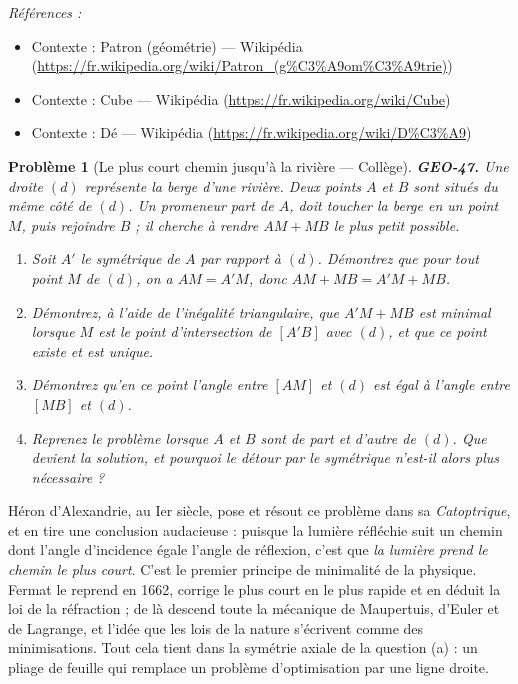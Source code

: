 \documentclass[11pt]{article}
\newtheorem{problem}{Problème}
\newenvironment{refs}{\par\small\noindent\emph{Références :}\begin{itemize}\setlength\itemsep{0pt}}{\end{itemize}\normalsize}
\begin{document}
\begin{refs}
\item Contexte : Patron (géométrie) --- Wikipédia (\url{https://fr.wikipedia.org/wiki/Patron_(g%C3%A9om%C3%A9trie)})
\item Contexte : Cube --- Wikipédia (\url{https://fr.wikipedia.org/wiki/Cube})
\item Contexte : Dé --- Wikipédia (\url{https://fr.wikipedia.org/wiki/D%C3%A9})
\end{refs}

\bigskip

\begin{problem}[{Le plus court chemin jusqu'à la rivière --- Collège}]
\textbf{GEO-47.} Une droite $ (d) $ représente la berge d'une rivière. Deux points $ A $ et
$ B $ sont situés du même côté de $ (d) $. Un promeneur part de $ A $, doit toucher la berge en
un point $ M $, puis rejoindre $ B $ ; il cherche à rendre $ AM + MB $ le plus petit possible.
\begin{enumerate}
\item[(a)] Soit $ A' $ le symétrique de $ A $ par rapport à $ (d) $. Démontrez que pour tout point
$ M $ de $ (d) $, on a $ AM = A'M $, donc $ AM + MB = A'M + MB $.
\item[(b)] Démontrez, à l'aide de l'inégalité triangulaire, que $ A'M + MB $ est minimal lorsque $ M $
est le point d'intersection de $ [A'B] $ avec $ (d) $, et que ce point existe et est unique.
\item[(c)] Démontrez qu'en ce point l'angle entre $ [AM] $ et $ (d) $ est égal à l'angle entre
$ [MB] $ et $ (d) $.
\item[(d)] Reprenez le problème lorsque $ A $ et $ B $ sont de part et d'autre de $ (d) $. Que devient
la solution, et pourquoi le détour par le symétrique n'est-il alors plus nécessaire ?
\end{enumerate}

\end{problem}

\noindent Héron d'Alexandrie, au Ier siècle, pose et résout ce problème dans sa
\textit{Catoptrique}, et en tire une conclusion audacieuse : puisque la lumière réfléchie suit un chemin
dont l'angle d'incidence égale l'angle de réflexion, c'est que \textit{la lumière prend le chemin le plus
court}. C'est le premier principe de minimalité de la physique. Fermat le reprend en 1662, corrige
\og{} le plus court \fg{} en \og{} le plus rapide \fg{} et en déduit la loi de la réfraction ; de là descend toute la
mécanique de Maupertuis, d'Euler et de Lagrange, et l'idée que les lois de la nature s'écrivent comme
des minimisations. Tout cela tient dans la symétrie axiale de la question (a) : un pliage de feuille
qui remplace un problème d'optimisation par une ligne droite.
\end{document}
